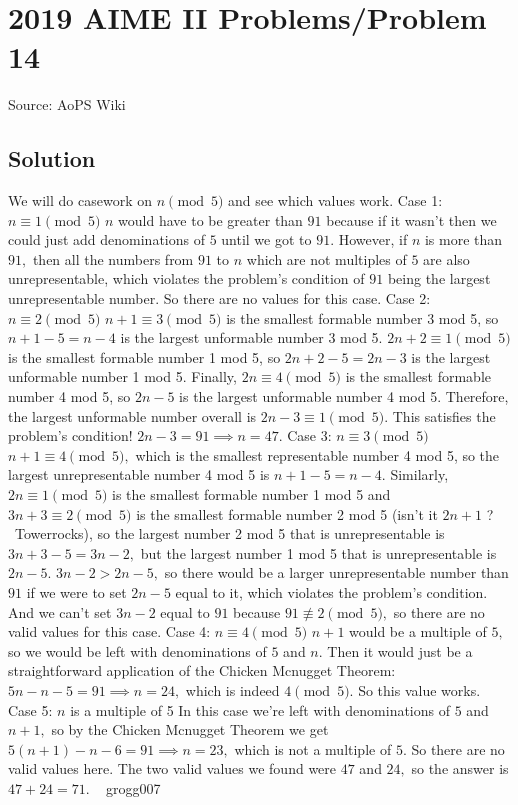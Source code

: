 \documentclass[12pt]{article}
\begin{document}
\section*{{2019 AIME II Problems/Problem 14}}
Source: AoPS Wiki

\subsection*{Solution}
We will do casework on $n \pmod{5}$ and see which values work. Case 1: $n \equiv 1 \pmod{5}$ $n$ would have to be greater than $91$ because if it wasn't then we could just add denominations of $5$ until we got to $91.$ However, if $n$ is more than $91,$ then all the numbers from $91$ to $n$ which are not multiples of $5$ are also unrepresentable, which violates the problem's condition of $91$ being the largest unrepresentable number. So there are no values for this case. Case 2: $n \equiv 2 \pmod{5}$ $n + 1 \equiv 3 \pmod{5}$ is the smallest formable number 3 mod 5, so $n + 1 - 5 = n - 4$ is the largest unformable number 3 mod 5. $2n + 2 \equiv 1 \pmod{5}$ is the smallest formable number 1 mod 5, so $2n + 2 - 5 = 2n - 3$ is the largest unformable number 1 mod 5. Finally, $2n \equiv 4 \pmod{5}$ is the smallest formable number 4 mod 5, so $2n - 5$ is the largest unformable number 4 mod 5. Therefore, the largest unformable number overall is $2n - 3 \equiv 1 \pmod{5}.$ This satisfies the problem's condition! $2n - 3 = 91 \implies n = 47.$ Case 3: $n \equiv 3 \pmod{5}$ $n + 1 \equiv 4 \pmod{5},$ which is the smallest representable number 4 mod 5, so the largest unrepresentable number 4 mod 5 is $n + 1 - 5 = n -4.$ Similarly, $2n \equiv 1 \pmod{5}$ is the smallest formable number 1 mod 5 and $3n + 3 \equiv 2 \pmod{5}$ is the smallest formable number 2 mod 5 (isn't it $2n + 1$ ? ~Towerrocks), so the largest number 2 mod 5 that is unrepresentable is $3n + 3 - 5 = 3n - 2,$ but the largest number 1 mod 5 that is unrepresentable is $2n -5.$ $3n - 2 > 2n - 5,$ so there would be a larger unrepresentable number than $91$ if we were to set $2n - 5$ equal to it, which violates the problem's condition. And we can't set $3n - 2$ equal to $91$ because $91 \not\equiv 2 \pmod{5},$ so there are no valid values for this case. Case 4: $n \equiv 4 \pmod{5}$ $n + 1$ would be a multiple of $5,$ so we would be left with denominations of $5$ and $n.$ Then it would just be a straightforward application of the Chicken Mcnugget Theorem: $5n - n - 5 = 91 \implies n = 24,$ which is indeed $4 \pmod{5}.$ So this value works. Case 5: $n$ is a multiple of 5 In this case we’re left with denominations of $5$ and $n + 1,$ so by the Chicken Mcnugget Theorem we get $5(n + 1) - n - 6 = 91 \implies n = 23,$ which is not a multiple of $5.$ So there are no valid values here. The two valid values we found were $47$ and $24,$ so the answer is $47 + 24 = \boxed{71}.$ ~ grogg007
\end{document}
